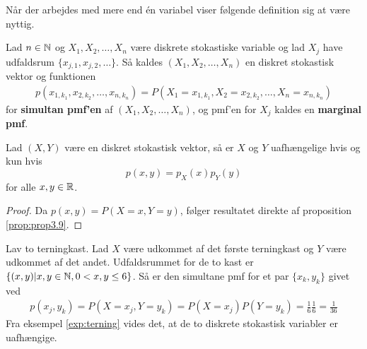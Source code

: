 Når der arbejdes med mere end én variabel viser følgende definition sig at være nyttig.
\begin{defn} %
    Lad $n \in \mathbb{N}$ og $X_1, X_2, \ldots, X_n$ være diskrete stokastiske variable og lad $X_j$ have udfaldsrum $\{x_{j, 1}, x_{j, 2}, \ldots\}$. Så kaldes $(X_1, X_2, \ldots, X_n)$ en diskret stokastisk vektor og funktionen
    \begin{align*}
        p(x_{1, k_1}, x_{2, k_2}, \ldots, x_{n, k_n}) = P(X_1 = x_{1,k_1}, X_2 = x_{2, k_2}, \ldots, X_n = x_{n, k_n})
    \end{align*}
    for \textbf{simultan pmf'en} af $(X_1, X_2, \ldots, X_n)$, og pmf'en for $X_j$ kaldes en \textbf{marginal pmf}.
\end{defn}
\begin{cor}
Lad $(X, Y)$ være en diskret stokastisk vektor, så er $X$ og $Y$ uafhængelige hvis og kun hvis
\begin{equation*}
    p(x, y) = p_X(x)p_Y(y)
\end{equation*}
for alle $x, y \in \mathbb{R}$.
\end{cor}
\begin{proof}
Da $p(x, y) = P(X = x, Y = y)$, følger resultatet direkte af proposition \ref{prop:prop3.9}.
\end{proof}


\begin{exmp} \label{examp:tern_vektor}
    Lav to terningkast. Lad $X$ være udkommet af det første terningkast og $Y$ være udkommet af det andet. 
    Udfaldsrummet for de to kast er $\{(x, y) | x, y \in \mathbb{N}, 0 < x, y \leq 6\}$. Så er den simultane pmf for et par $\{x_k,y_k\}$ givet ved
    \begin{align*}
        p(x_j,y_k)=P(X=x_j,Y=y_k)=P(X=x_j)P(Y=y_k)=\frac{1}{6}\frac{1}{6}=\frac{1}{36}
    \end{align*}
Fra eksempel \ref{exp:terning} vides det, at de to diskrete stokastisk variabler er uafhængige.
\end{exmp}

